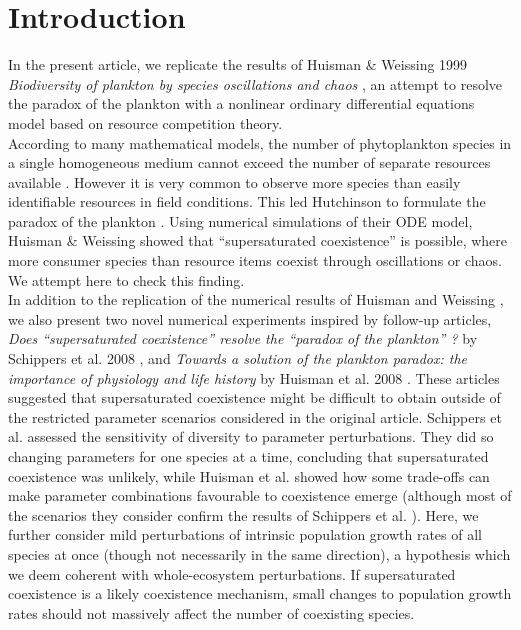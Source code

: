 \section{Introduction}
In the present article, we replicate the results of Huisman \& Weissing 1999 \textit{Biodiversity of plankton by species oscillations and chaos} \cite{1999:Huisman}, an attempt to resolve the paradox of the plankton \cite{1961:Hutchinson} with a nonlinear ordinary differential equations model based on resource competition theory.\\

According to many mathematical models, the number of phytoplankton species in a single homogeneous medium cannot exceed the number of separate resources available \cite{1960:Hardin,1973:Phillips,1980:Armstrong}. However it is very common to observe more species than easily identifiable resources in field conditions. This led Hutchinson to formulate the paradox of the plankton \cite{1961:Hutchinson}. Using numerical simulations of their ODE model, Huisman \& Weissing \cite{1999:Huisman} showed that ``supersaturated coexistence'' is possible, where more consumer species than resource items coexist through oscillations or chaos. We attempt here to check this finding. \\

In addition to the replication of the numerical results of Huisman and Weissing \cite{1999:Huisman}, we also present two novel numerical experiments inspired by follow-up articles, \textit{Does ``supersaturated coexistence'' resolve the ``paradox of the plankton'' ?} by Schippers et al. 2008 \cite{2008:Schippers}, and \textit{Towards a solution of the plankton paradox: the importance of physiology and life history} by Huisman et al. 2008 \cite{2008:Huisman}. These articles suggested that supersaturated coexistence might be difficult to obtain outside of the restricted parameter scenarios considered in the original article. Schippers et al. \cite{2008:Schippers} assessed the sensitivity of diversity to parameter perturbations. They did so changing parameters for one species at a time, concluding that supersaturated coexistence was unlikely, while Huisman et al. \cite{2008:Huisman} showed how some trade-offs can make parameter combinations favourable to coexistence emerge (although most of the scenarios they consider confirm the results of Schippers et al. \cite{2008:Schippers}). Here, we further consider mild perturbations of intrinsic population growth rates of all species at once (though not necessarily in the same direction), a hypothesis which we deem coherent with whole-ecosystem perturbations. If supersaturated coexistence is a likely coexistence mechanism, small changes to population growth rates should not massively affect the number of coexisting species. 

